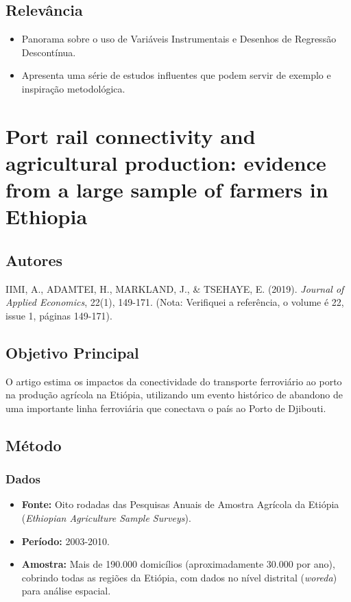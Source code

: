 \documentclass[12pt]{article}
\begin{document}
\subsection*{Relevância}
\begin{itemize}[leftmargin=*]
    \item Panorama sobre o uso de Variáveis Instrumentais e Desenhos de Regressão Descontínua.
    \item Apresenta uma série de estudos influentes que podem servir de exemplo e inspiração metodológica.
\end{itemize}

\newpage
\section{Port rail connectivity and agricultural production: evidence from a large sample of farmers in Ethiopia}
 
\subsection*{Autores}
IIMI, A., ADAMTEI, H., MARKLAND, J., \& TSEHAYE, E. (2019). \textit{Journal of Applied Economics}, 22(1), 149-171. (Nota: Verifiquei a referência, o volume é 22, issue 1, páginas 149-171).

\subsection*{Objetivo Principal}
O artigo estima os impactos da conectividade do transporte ferroviário ao porto na produção agrícola na Etiópia, utilizando um evento histórico de abandono de uma importante linha ferroviária que conectava o país ao Porto de Djibouti.

\subsection*{Método}

\subsubsection*{Dados}
\begin{itemize}
    \item \textbf{Fonte:} Oito rodadas das Pesquisas Anuais de Amostra Agrícola da Etiópia (\textit{Ethiopian Agriculture Sample Surveys}).
    \item \textbf{Período:} 2003-2010.
    \item \textbf{Amostra:} Mais de 190.000 domicílios (aproximadamente 30.000 por ano), cobrindo todas as regiões da Etiópia, com dados no nível distrital (\textit{woreda}) para análise espacial.
\end{itemize}
\end{document}
